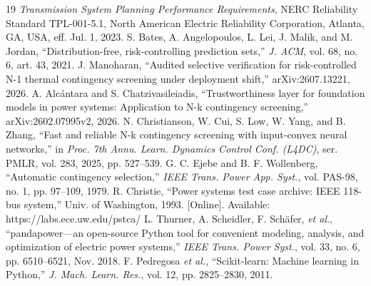 \documentclass[conference]{IEEEtran}
\begin{document}
\begin{thebibliography}{19}
 \textit{Transmission System Planning Performance Requirements}, NERC Reliability Standard TPL-001-5.1, North American Electric Reliability Corporation, Atlanta, GA, USA, eff. Jul. 1, 2023.
 S. Bates, A. Angelopoulos, L. Lei, J. Malik, and M. Jordan, ``Distribution-free, risk-controlling prediction sets,'' \textit{J. ACM}, vol. 68, no. 6, art. 43, 2021.
 J. Manoharan, ``Audited selective verification for risk-controlled N-1 thermal contingency screening under deployment shift,'' arXiv:2607.13221, 2026.
 A. Alc\'antara and S. Chatzivasileiadis, ``Trustworthiness layer for foundation models in power systems: Application to N-k contingency screening,'' arXiv:2602.07995v2, 2026.
 N. Christianson, W. Cui, S. Low, W. Yang, and B. Zhang, ``Fast and reliable N-k contingency screening with input-convex neural networks,'' in \textit{Proc. 7th Annu. Learn. Dynamics Control Conf. (L4DC)}, ser. PMLR, vol. 283, 2025, pp. 527--539.
 G. C. Ejebe and B. F. Wollenberg, ``Automatic contingency selection,'' \textit{IEEE Trans. Power App. Syst.}, vol. PAS-98, no. 1, pp. 97--109, 1979.
 R. Christie, ``Power systems test case archive: IEEE 118-bus system,'' Univ. of Washington, 1993. [Online]. Available: https://labs.ece.uw.edu/pstca/
 L. Thurner, A. Scheidler, F. Sch\"afer, \textit{et al.}, ``pandapower---an open-source Python tool for convenient modeling, analysis, and optimization of electric power systems,'' \textit{IEEE Trans. Power Syst.}, vol. 33, no. 6, pp. 6510--6521, Nov. 2018.
 F. Pedregosa \textit{et al.}, ``Scikit-learn: Machine learning in Python,'' \textit{J. Mach. Learn. Res.}, vol. 12, pp. 2825--2830, 2011.

\end{thebibliography}
\end{document}
